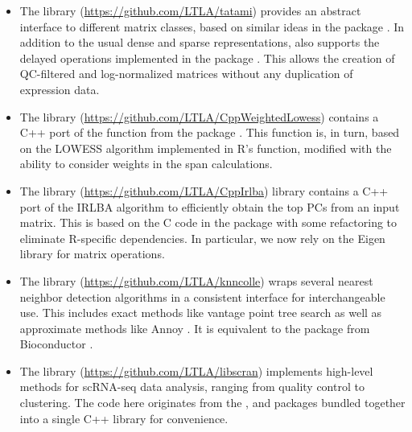 \documentclass{article}
\begin{document}
\begin{itemize}
\item The  library (\url{https://github.com/LTLA/tatami}) provides an abstract interface to different matrix classes, 
based on similar ideas in the  package \cite{lun2018beachmat}. 
In addition to the usual dense and sparse representations,  also supports the delayed operations implemented in the  package \cite{delayedarray}.
This allows the creation of QC-filtered and log-normalized matrices without any duplication of expression data.
\item The  library (\url{https://github.com/LTLA/CppWeightedLowess}) contains a C++ port of the  function from the  package \cite{ritchie2015limma}.
This function is, in turn, based on the LOWESS algorithm \cite{cleveland1979robust} implemented in R's  function, 
modified with the ability to consider weights in the span calculations.
\item The  library (\url{https://github.com/LTLA/CppIrlba}) library contains a C++ port of the IRLBA algorithm \cite{baglama2005augmented} to efficiently obtain the top PCs from an input matrix.
This is based on the C code in the  package \cite{irlba} with some refactoring to eliminate R-specific dependencies.
In particular, we now rely on the Eigen library \cite{eigenweb} for matrix operations.
\item The  library (\url{https://github.com/LTLA/knncolle}) wraps several nearest neighbor detection algorithms in a consistent interface for interchangeable use.
This includes exact methods like vantage point tree search \cite{yianilos1993data} as well as approximate methods like Annoy \cite{annoy}.
It is equivalent to the  package from Bioconductor \cite{biocneighbors}.
\item The  library (\url{https://github.com/LTLA/libscran}) implements high-level methods for scRNA-seq data analysis, ranging from quality control to clustering.
The code here originates from the ,  and  packages \cite{lun2016step,lun2017scater} bundled together into a single C++ library for convenience. 

\end{itemize}
\end{document}
